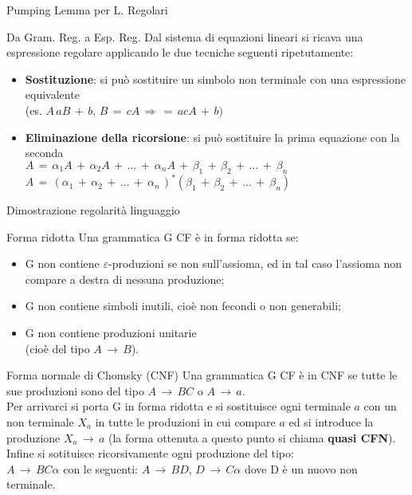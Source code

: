 \documentclass[10pt,a4paper]{article}
\begin{document}
\begin{multicols}{3}
\begin{textbox}{Pumping Lemma per L. Regolari}
\end{textbox}

\begin{textbox}{Da Gram. Reg. a Esp. Reg.}
Dal sistema di equazioni lineari si ricava una espressione regolare
applicando le due tecniche seguenti ripetutamente:
\begin{itemize}[leftmargin=*]
    \item \textbf{Sostituzione}: si può sostituire un simbolo non terminale con una espressione equivalente \\
    (es. \(A\, aB\, +\, b,\, B\, =\, cA\,\Rightarrow \,  =\, acA\, +\, b)\)
    \item \textbf{Eliminazione della ricorsione}: si può sostituire la prima equazione con la seconda\\
    \(A\,=\,\alpha_1A\,+\,\alpha_2A\,+\,...\,+\
    \alpha_nA\,+\,\beta_1\,+\,\beta_2\,+\,...\,+\
    \beta_n\) \\
    \(A\,=\,(\alpha_1\,+\,\alpha_2\,+\,...\,+\
    \alpha_n\,)^\ast(\beta_1\,+\,\beta_2\,+\,...\,+\
    \beta_n)\)
\end{itemize}

\end{textbox}


\begin{textbox}{Dimostrazione regolarità linguaggio}
\lipsum[1]

\end{textbox}

\begin{textbox}{Forma ridotta}
Una grammatica G CF è in forma ridotta se:
\begin{itemize}[leftmargin=*]
    \item G non contiene \(\varepsilon\)-produzioni
    se non sull’assioma, ed in tal caso l’assioma non
    compare a destra di nessuna produzione;
    \item G non contiene simboli inutili, cioè non fecondi o non generabili;
    \item G non contiene produzioni unitarie\\(cioè del tipo \(A\,\rightarrow\,B\)).
\end{itemize}

\end{textbox}

\begin{textbox}{Forma normale di Chomsky (CNF)}
Una grammatica G CF è in CNF se tutte le sue produzioni sono del tipo \(A\,\rightarrow\,BC\) o \(A\,\rightarrow\,a\).\\
Per arrivarci si porta G in forma ridotta e si sostituisce ogni terminale \(a\) con un non terminale \(X_a\) in tutte le produzioni
in cui compare \(a\) ed si introduce la produzione \(X_a\,\rightarrow\,a\)
(la forma ottenuta a questo punto si chiama \textbf{quasi CFN}).\\
Infine si sotituisce ricorsivamente ogni produzione del tipo:\\
\(A\,\rightarrow\,BC\alpha\) con le seguenti:
\(A\,\rightarrow\,BD\), \(D\,\rightarrow\,C\alpha\) dove D è un nuovo non terminale.
\end{textbox}



\end{multicols}
\end{document}
